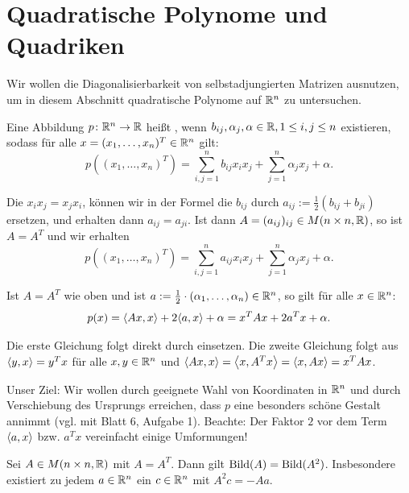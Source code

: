 \section{Quadratische Polynome und Quadriken}
\label{sec:2.8}

Wir wollen die Diagonalisierbarkeit von selbstadjungierten Matrizen ausnutzen, um in diesem Abschnitt quadratische Polynome auf $\mathbb{R}^n$ zu untersuchen.

\begin{definition}
	\label{def:8.1}
	Eine Abbildung $p \colon \mathbb{R}^n \rightarrow \mathbb{R}$ heißt , wenn $b_{ij}, \alpha_j, \alpha \in \mathbb{R}, 1 \leq i,j \leq n$ existieren, sodass für alle $x = (x_1,\dots,x_n)^T \in \mathbb{R}^n$ gilt:
	\[
		p((x_1,\dots,x_n)^T) = \sum_{i,j=1}^{n} b_{ij} x_i x_j + \sum_{j=1}^{n} \alpha_j x_j + \alpha.
	\]
\end{definition}

Die $x_ix_j = x_jx_i$, können wir in der Formel die $b_{ij}$ durch $a_{ij} := \frac{1}{2}(b_{ij} + b_{ji})$ ersetzen, und erhalten dann $a_{ij} = a_{ji}$.
Ist dann $A = (a_{ij})_{ij} \in M(n \times n, \mathbb{R})$, so ist $A = A^T$ und wir erhalten
\[
	p((x_1,\dots,x_n)^T) = \sum_{i,j=1}^{n} a_{ij} x_i x_j + \sum_{j=1}^{n} \alpha_j x_j + \alpha.
\]

\begin{lemma}
	\label{lemma:8.2}
	Ist $A = A^T$ wie oben und ist $a := \frac{1}{2} \cdot (\alpha_1,\dots,\alpha_n) \in \mathbb{R}^n$, so gilt für alle $x \in \mathbb{R}^n$:
	\[
		p(x) = \sk{Ax,x} + 2 \sk{a,x} + \alpha = x^T A x + 2 a^T x + \alpha.
	\]
\end{lemma}

\begin{beweis}
	Die erste Gleichung folgt direkt durch einsetzen.
	Die zweite Gleichung folgt aus $\left\langle y,x\right\rangle = y^Tx$ für alle $x,y \in \mathbb{R}^n$ und $\left\langle Ax,x\right\rangle = \left\langle x,A^Tx\right\rangle = \left\langle x,Ax\right\rangle = x^T Ax$. \qedhere
\end{beweis}

Unser Ziel: Wir wollen durch geeignete Wahl von Koordinaten in $\mathbb{R}^n$ und durch Verschiebung des Ursprungs erreichen, dass $p$ eine besonders schöne Gestalt annimmt (vgl. mit Blatt 6, Aufgabe 1).
Beachte: Der Faktor $2$ vor dem Term $\left\langle a,x\right\rangle$ bzw. $a^Tx$ vereinfacht einige Umformungen!

\begin{lemma}
	\label{lemma:8.3}
	Sei $A \in M(n \times n,\mathbb{R})$ mit $A = A^T$.
	Dann gilt $\operatorname{Bild}(A) = \operatorname{Bild}(A^2)$.
	Insbesondere existiert zu jedem $a \in \mathbb{R}^n$ ein $c \in \mathbb{R}^n$ mit $A^2c = -Aa$.
\end{lemma}

